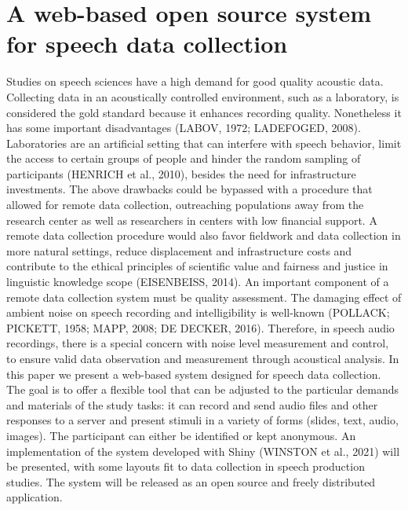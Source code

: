 \chapter{A web-based open source system for speech data collection}\label{ch:mariamendesca21}
\begin{affils}
\end{affils}

Studies on speech sciences have a high demand for good quality acoustic data. Collecting data in an acoustically controlled environment, such as a laboratory, is considered the gold standard because it enhances recording quality. Nonetheless it has some important disadvantages (LABOV, 1972; LADEFOGED, 2008). Laboratories are an artificial setting that can interfere with speech behavior, limit the access to certain groups of people and hinder the random sampling of participants (HENRICH et al., 2010), besides the need for infrastructure investments. The above drawbacks could be bypassed with a procedure that allowed for remote data collection, outreaching populations away from the research center as well as researchers in centers with low financial support. A remote data collection procedure would also favor fieldwork and data collection in more natural settings, reduce displacement and infrastructure costs and contribute to the ethical principles of scientific value and fairness and justice in linguistic knowledge scope (EISENBEISS, 2014). An important component of a remote data collection system must be quality assessment. The damaging effect of ambient noise on speech recording and intelligibility is well-known (POLLACK; PICKETT, 1958; MAPP, 2008; DE DECKER, 2016). Therefore, in speech audio recordings, there is a special concern with noise level measurement and control, to ensure valid data observation and measurement through acoustical analysis. In this paper we present a web-based system designed for speech data collection. The goal is to offer a flexible tool that can be adjusted to the particular demands and materials of the study tasks: it can record and send audio files and other responses to a server and present stimuli in a variety of forms (slides, text, audio, images). The participant can either be identified or kept anonymous. An implementation of the system developed with Shiny (WINSTON et al., 2021) will be presented, with some layouts fit to data collection in speech production studies. The system will be released as an open source and freely distributed application.


